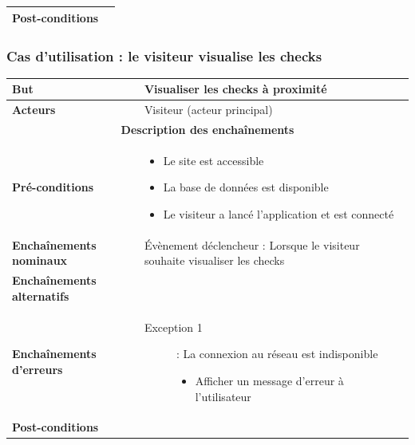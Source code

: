 \documentclass[a4paper,12pt]{report}
\begin{document}
\begin{onehalfspace}
\begin{tabular}{|p{3cm}|p{}|}
\textbf{Post-conditions} &
\\ \hline %

\end{tabular}

\subsubsection{Cas d'utilisation : le visiteur visualise les checks} %

\begin{tabular}{|p{3cm}|p{}|}
\hline %

\textbf{But} &
Visualiser les checks à proximité
\\ \hline %

\textbf{Acteurs} &
Visiteur (acteur principal)
\\ \hline %

\multicolumn{2}{|c|}{\textbf{Description des enchaînements}}
\\ \hline %

\textbf{Pré-conditions} &
    \begin{itemize}
      \item Le site est accessible
      \item La base de données est disponible
      \item Le visiteur a lancé l'application et est connecté
    \end{itemize}
\\ \hline %

\textbf{Enchaînements nominaux} &
Évènement déclencheur : Lorsque le visiteur souhaite visualiser les checks
\\ \hline %

\textbf{Enchaînements alternatifs} &
\\ \hline %

\textbf{Enchaînements d'erreurs} &
  \begin{description}
    \item[Exception 1]: La connexion au réseau est indisponible
    \begin{itemize}
      \item Afficher un message d’erreur à l'utilisateur
    \end{itemize}
  \end{description}
\\ \hline %

\textbf{Post-conditions} &
\\ \hline %


\end{tabular}
\end{onehalfspace}
\end{document}
